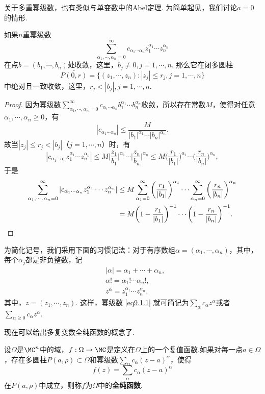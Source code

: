 关于多重幂级数，也有类似与单变数中的Abel定理. 为简单起见，我们讨论$a=0$的情形.
\begin{prop}\label{prop9.1.1}
如果$n$重幂级数
\begin{equation}\label{eq9.1.1}
\sum_{\alpha_1,\cdots,\alpha_n=0}^\infty c_{\alpha_1\cdots\alpha_n}z_1^{\alpha_1}
\cdots z_n^{\alpha_n}
\end{equation}
在点$b=(b_1,\cdots,b_n)$处收敛，这里，$b_j\ne0,j=1,\cdots,n$. 那么它在闭多圆柱
\[\bar{P(0,r)}=\{(z_1,\cdots,z_n):|z_j|\le r_j,j=1,\cdots,n\}\]
中绝对且一致收敛，这里，$r_j<|b_j|,j=1,\cdots,n$.
\end{prop}
\begin{proof}
因为幂级数$\sum_{\alpha_1,\cdots,\alpha_n=0}^\infty c_{\alpha_1\cdots\alpha_n}b_1^{\alpha_1}
\cdots b_n^{\alpha_n}$收敛，所以存在常数$M$，使得对任意$\alpha_1,\cdots,\alpha_n\ge0$，有
\[|c_{\alpha_1\cdots\alpha_n}|\le\frac M{|b_1|^{\alpha_1}\cdots|b_n|^{\alpha_n}}.\]
故当$|z_j|\le r_j<|b_j|$（$j=1,\cdots,n$）时，有
\[|c_{\alpha_1\cdots\alpha_n}z_1^{\alpha_1}
\cdots z_n^{\alpha_n}|\le M\bigg|\frac{z_1}{b_1}\bigg|^{\alpha_1}\cdots
\bigg|\frac{z_n}{b_n}\bigg|^{\alpha_n}
\le M\bigg(\frac{r_1}{|b_1|}\bigg)^{\alpha_1}\cdots
\bigg(\frac{r_n}{|b_n|}\bigg)^{\alpha_n},\]
于是
\begin{align*}
  \sum_{\alpha_1,\cdots,\alpha_n=0}^\infty |c_{\alpha_1\cdots\alpha_n}z_1^{\alpha_1}
  \cdots z_n^{\alpha_n}|&\le M\sum_{\alpha_1=0}^\infty \bigg(\frac{r_1}{|b_1|}\bigg)^{\alpha_1}\cdots\sum_{\alpha_n=0}^\infty
  \bigg(\frac{r_n}{|b_n|}\bigg)^{\alpha_n}\\
  & = M\bigg(1-\frac{r_1}{|b_1|}\bigg)^{-1} \cdots\bigg(1-\frac{r_n}{|b_n|}\bigg)^{-1}. \qedhere
\end{align*}
\end{proof}

为简化记号，我们采用下面的习惯记法：对于有序数组$\alpha=(\alpha_1,\cdots,\alpha_n)$，其中，每个$\alpha_j$都是非负整数，记
\begin{align*}
&|\alpha|=\alpha_1+\cdots+\alpha_n,\\
&\alpha!=\alpha_1!\cdots\alpha_n!,\\
&z^\alpha=z_1^{\alpha_1}\cdots z_n^{\alpha_n},
\end{align*}
其中，$z=(z_1,\cdots,z_n)$. 这样，幂级数 \eqref{eq9.1.1} 就可简记为$\sum_\alpha c_\alpha z^\alpha$或者$\sum_{\alpha\ge0}c_\alpha z^\alpha$.

现在可以给出多复变数全纯函数的概念了.
\begin{definition}\label{def9.1.2}
设$\Omega$是$\MC^n$中的域，$f:\Omega\to \MC$是定义在$\Omega$上的一个复值函数.如果对每一点$a\in\Omega$，存在多圆柱$P(a,\rho)\subset\Omega$和幂级数$\sum_\alpha c_\alpha(z-a)^\alpha$，使得
\begin{equation}\label{eq9.1.2}
f(z)=\sum_\alpha c_\alpha(z-a)^\alpha
\end{equation}
在$P(a,\rho)$中成立，则称$f$为$\Omega$中的\textbf{全纯函数}.
\end{definition}

